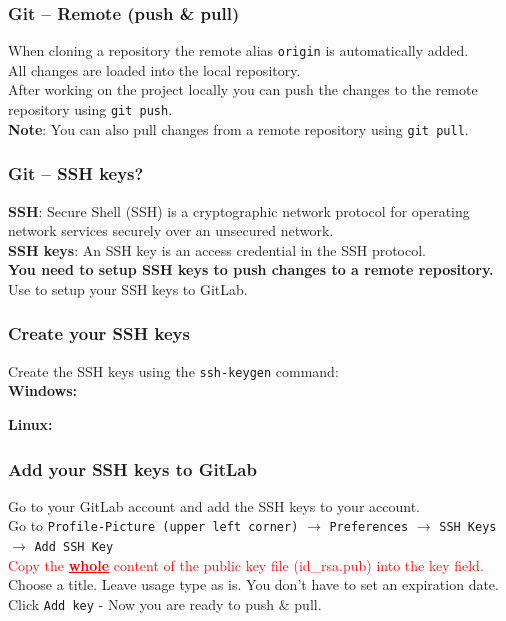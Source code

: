 \documentclass{beamer}
\begin{document}
\begin{frame}
  \frametitle{Git -- Remote (push \& pull)}
  When cloning a repository the remote alias \texttt{origin} is automatically added.\\
  All changes are loaded into the local repository.\\
  \vspace{5mm}
  After working on the project locally you can push the changes to the remote repository using \texttt{git push}.\\
  \vspace{5mm}
  \textbf{Note}: You can also pull changes from a remote repository using \texttt{git pull}.\\
\end{frame}

\begin{frame}
  \frametitle{Git -- SSH keys?}
  \textbf{SSH}: Secure Shell (SSH) is a cryptographic network protocol for operating network services securely over an unsecured network.\\
  \vspace{5mm}
  \textbf{SSH keys}: An SSH key is an access credential in the SSH protocol.\\
  \vspace{5mm}
  \textbf{You need to setup SSH keys to push changes to a remote repository.}\\
  \vspace{5mm}
  Use  to setup  your SSH keys to GitLab.\\
\end{frame}

\begin{frame}
  \frametitle{Create your SSH keys}
  Create the SSH keys using the \texttt{ssh-keygen} command:\\
  
  \textbf{Windows:}
  
  \textbf{Linux:}
  
\end{frame}
\begin{frame}
  \frametitle{Add your SSH keys to GitLab}
  Go to your GitLab account and add the SSH keys to your account.\\
  \vspace{5mm}
  Go to \texttt{Profile-Picture (upper left corner)}  $\rightarrow$ \texttt{Preferences} $\rightarrow$ \texttt{SSH Keys} $\rightarrow$ \texttt{Add SSH Key}\\
  \textcolor{red}{Copy the \textbf{\underline{whole}} content of the public key file (id\_rsa.pub) into the key field.}\\
  \vspace{5mm}
  Choose a title. Leave usage type as is. You don't have to set an expiration date.\\
  Click \texttt{Add key} - Now you are ready to push \& pull.\\
\end{frame}
\end{document}

